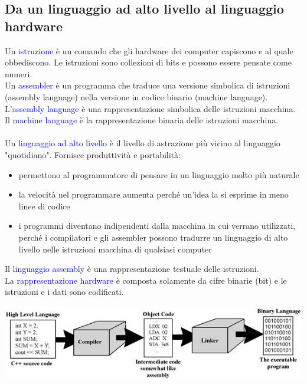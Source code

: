 \documentclass[12pt,a4paper]{article}
\begin{document}
\subsection{Da un linguaggio ad alto livello al linguaggio hardware}
Un \textcolor{blue}{istruzione} è un comando che gli hardware dei computer capiscono e al quale obbediscono. Le istruzioni sono collezioni di bits e possono essere pensate come numeri.\\
Un \textcolor{blue}{assembler} è un programma che traduce una versione simbolica di istruzioni (assembly language) nella versione in codice binario (machine language).\\
L'\textcolor{blue}{assembly language} è una rappresentazione simbolica delle istruzioni macchina.\\
Il \textcolor{blue}{machine language} è la rappresentazione binaria delle istruzioni macchina.\\
\\
Un \textcolor{blue}{linguaggio ad alto livello} è il livello di astrazione più vicino al linguaggio "quotidiano". Fornisce produttività e portabilità: \begin{itemize}
	\item permettono al programmatore di pensare in un linguaggio molto più naturale
	\item la velocità nel programmare aumenta perché un'idea la si esprime in meno linee di codice
	\item i programmi diventano indipendenti dalla macchina in cui verrano utilizzati, perché i compilatori e gli assembler possono tradurre un linguaggio di alto livello nelle istruzioni macchina di qualsiasi computer
\end{itemize}
Il \textcolor{blue}{linguaggio assembly} è una rappresentazione testuale delle istruzioni.\\
La \textcolor{blue}{rappresentazione hardware} è composta solamente da cifre binarie (bit) e le istruzioni e i dati sono codificati.
\begin{center}
\includegraphics[width=1\columnwidth]{img/HLL_to_machine.jpeg}
\end{center}
\end{document}
